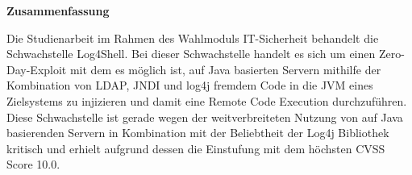 
\textbf{\large Zusammenfassung}
\begin{justify}
Die Studienarbeit im Rahmen des Wahlmoduls IT-Sicherheit behandelt die Schwachstelle Log4Shell.
Bei dieser Schwachstelle handelt es sich um einen Zero-Day-Exploit mit dem es möglich ist, auf Java basierten
Servern mithilfe der Kombination von LDAP, JNDI und log4j fremdem Code in die JVM eines Zielsystems zu
injizieren und damit eine Remote Code Execution durchzuführen.
Diese Schwachstelle ist gerade wegen der weitverbreiteten
Nutzung von auf Java basierenden Servern in Kombination mit der Beliebtheit der Log4j Bibliothek kritisch und erhielt aufgrund dessen die Einstufung
mit dem höchsten CVSS Score 10.0.
\end{justify}

